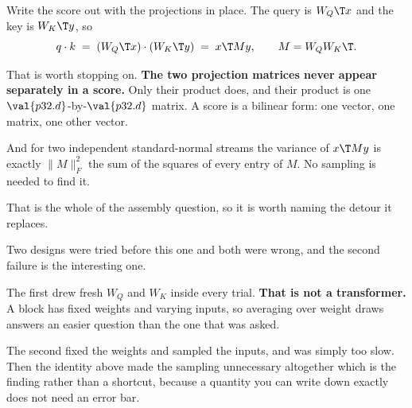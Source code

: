 \begin{fr}

Write the score out with the projections in place. The query is
$W_Q\T x$ and the key is $W_K\T y$, so
\[ q \cdot k \;=\; (W_Q\T x) \cdot (W_K\T y) \;=\; x\T M y,
   \qquad M = W_Q W_K\T. \]

That is worth stopping on. \textbf{The two projection matrices never appear
separately in a score.} Only their product does, and their product is one
$\val{p32.d}$-by-$\val{p32.d}$ matrix. A score is a bilinear form: one
vector, one matrix, one other vector.

And for two independent standard-normal streams the variance of $x\T M y$ is
exactly $\lVert M\rVert_F^{2}$ \dash{} the sum of the squares of every entry
of $M$. No sampling is needed to find it.

That is the whole of the assembly question, so it is worth naming the
detour it replaces.

\begin{note}
Two designs were tried before this one and both were wrong, and the second
failure is the interesting one.

The first drew fresh $W_Q$ and $W_K$ inside every trial. \textbf{That is not
a transformer.} A block has fixed weights and varying inputs, so averaging
over weight draws answers an easier question than the one that was asked.

The second fixed the weights and sampled the inputs, and was simply too
slow. Then the identity above made the sampling unnecessary altogether
\dash{} which is the finding rather than a shortcut, because a quantity you
can write down exactly does not need an error bar.
\end{note}
\end{fr}

